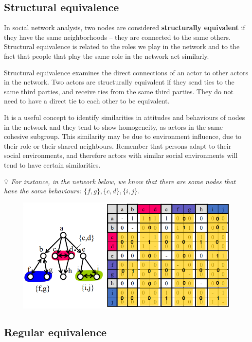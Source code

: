 \documentclass[
  notitlepage,
  onecolumn,
  openany]{book}
\begin{document}
\hypertarget{structural-equivalence}{%
\subsection{Structural equivalence}\label{structural-equivalence}}

In social network analysis, two nodes are considered \textbf{structurally equivalent} if they have the same neighborhoods -- they are connected to the same others. Structural equivalence is related to the roles we play in the network and to the fact that people that play the same role in the network act similarly.

Structural equivalence examines the direct connections of an actor to other actors in the network. Two actors are structurally equivalent if they send ties to the same third parties, and receive ties from the same third parties. They do not need to have a direct tie to each other to be equivalent.

It is a useful concept to identify similarities in attitudes and behaviours of nodes in the network and they tend to show homogeneity, as actors in the same cohesive subgroup. This similarity may be due to environment influence, due to their role or their shared neighbours. Remember that persons adapt to their social environments, and therefore actors with similar social environments will tend to have certain similarities.

💡 \emph{For instance, in the network below, we know that there are some nodes that have the same behaviours: \(\{f, g\}, \{c, d\}, \{i, j\}\).}

\begin{figure}[h!]

{\centering \includegraphics[width=0.5\linewidth]{images/11-Subgroups and Structural Equivalence/Untitled 4} 

}

\end{figure}

\hypertarget{regular-equivalence}{%
\subsection{Regular equivalence}\label{regular-equivalence}}
\end{document}

